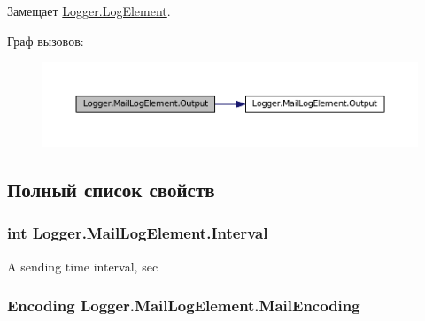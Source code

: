 Замещает \hyperlink{class_logger_1_1_log_element_aeab8fe7e6188f13e2617c8ac9d047f36}{Logger.\+Log\+Element}.



Граф вызовов\+:
\nopagebreak
\begin{figure}[H]
\begin{center}
\leavevmode
\includegraphics[width=350pt]{class_logger_1_1_mail_log_element_a97a0e43476c50853747f8d7b00cab465_cgraph}
\end{center}
\end{figure}




\subsection{Полный список свойств}
\hypertarget{class_logger_1_1_mail_log_element_a9e0ae290ef81208b6578da0ec0dcc2af}{}
\subsubsection[{Interval}]{\setlength{\rightskip}{0pt plus 5cm}int Logger.\+Mail\+Log\+Element.\+Interval\hspace{0.3cm}{\ttfamily [get]}}\label{class_logger_1_1_mail_log_element_a9e0ae290ef81208b6578da0ec0dcc2af}


A sending time interval, sec 

\hypertarget{class_logger_1_1_mail_log_element_a9cf2183282166c47d8641208e5bd9a5a}{}
\subsubsection[{Mail\+Encoding}]{\setlength{\rightskip}{0pt plus 5cm}Encoding Logger.\+Mail\+Log\+Element.\+Mail\+Encoding\hspace{0.3cm}{\ttfamily [get]}}\label{class_logger_1_1_mail_log_element_a9cf2183282166c47d8641208e5bd9a5a}
\hypertarget{class_logger_1_1_mail_log_element_ad31367eb4d1cbbf2dc72cd6ea9931b96}{}

